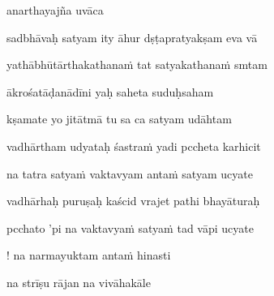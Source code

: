 \renewcommand{\dnapp}[1]{}\renewcommand{\rmapp}[1]{#1}

\vers

\vers

\vers

\vers

\vers

\vers
\szam\bek{}



\jump\jump

\vers

anarthayajña uvāca~{\dandab}\dontdisplaylinenum 

sadbhāvaḥ satyam ity āhur dṣṭapratyakṣam eva vā\thinspace{\danda} \dontdisplaylinenum

yathābhūtārthakathana\.m tat satyakathana\.m smtam \veg\dontdisplaylinenum

ākrośatāḍanādīni yaḥ saheta suduḥsaham\thinspace{\dandab} \dontdisplaylinenum

kṣamate yo jitātmā tu sa ca satyam udāhtam \veg\dontdisplaylinenum

vadhārtham udyataḥ śastra\.m yadi pccheta karhicit\thinspace{\dandab} \dontdisplaylinenum

na tatra satya\.m vaktavyam anta\.m satyam ucyate \veg\dontdisplaylinenum

vadhārhaḥ puruṣaḥ kaścid vrajet pathi bhayāturaḥ\thinspace{\dandab} \dontdisplaylinenum

pcchato 'pi na vaktavya\.m satya\.m tad vāpi ucyate \veg\dontdisplaylinenum

\ujvers\nemsloka 
! na narmayuktam anta\.m hinasti
\dontdisplaylinenum

\nemslokab 
na strīṣu rājan na vivāhakāle \danda\dontdisplaylinenum

